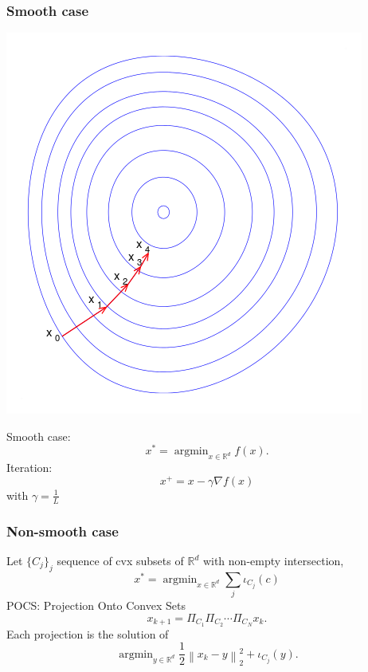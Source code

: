 \documentclass[aspectratio=169]{beamer}
\newcommand{\rd}{\mathbb{R}^d}
\newcommand{\normtwosq}[1]{\left\|#1\right\|_2^2}
\DeclareMathOperator*{\argmin}{argmin}
\begin{document}
		\begin{frame}
			\frametitle{Smooth case}
			\begin{minipage}{.45\textwidth}
			\includegraphics[width=\textwidth]{img/gradientdescent}
			\end{minipage}\qquad
			\begin{minipage}{.45\textwidth}
			Smooth case:
			\begin{equation}\nonumber
			x^*=\argmin_{x\in\rd}f(x).
			\end{equation}
			Iteration:
			\begin{equation}
			\nonumber
			x^+ = x - \gamma\nabla f(x)
			\end{equation}
			with $\gamma=\frac{1}{L}$
			\end{minipage}
		\end{frame}

		\begin{frame}
		\frametitle{Non-smooth case}
		Let $\{C_j\}_j$ sequence of cvx subsets of $\rd$ with non-empty intersection,
		\begin{equation}
		\nonumber
		x^*=\argmin_{x\in \rd}\sum_j \iota_{C_j}(c)
		\end{equation}
		\pause
		POCS: Projection Onto Convex Sets
		\begin{equation}
		\nonumber
		x_{k+1} = \Pi_{C_1}\Pi_{C_2}\cdots\Pi_{C_N} x_k.
		\end{equation}
		\pause
		Each projection is the solution of 
		\begin{equation}
		\nonumber
		\argmin_{y\in \rd}\frac{1}{2}\normtwosq{x_k-y} + \iota_{C_j}(y).
		\end{equation}
		\end{frame}
		
\end{document}
